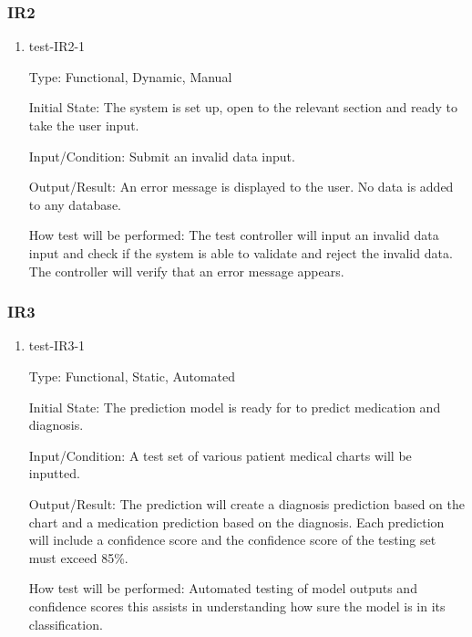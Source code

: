 \documentclass[12pt, titlepage]{article}
\begin{document}
\subsubsection{IR2}
  
  \begin{enumerate}

    \item{test-IR2-1} \label{test-IR2-1} %
    
    Type: Functional, Dynamic, Manual
    
    Initial State: The system is set up, open to the relevant section and ready to take the user input.
    
    Input/Condition: Submit an invalid data input.
    
    Output/Result: An error message is displayed to the user. No data is added to any database. 
    
    How test will be performed: The test controller will input an invalid data input and check if the system is able to validate and reject the invalid data. The controller will verify that an error message appears.

  \end{enumerate}

\subsubsection{IR3}
    
  \begin{enumerate}


    \item{test-IR3-1}  \label{test-IR3-1} %
    
    Type: Functional, Static, Automated
    
    Initial State: The prediction model is ready for to predict medication and diagnosis.
    
    Input/Condition: A test set of various patient medical charts will be inputted.
    
    Output/Result: The prediction will create a diagnosis prediction based on the chart and a medication prediction based on the diagnosis. Each prediction will include a confidence score and the confidence score of the testing set must exceed 85\%.
    
    How test will be performed: Automated testing of model outputs and confidence scores this assists in understanding how sure the model is in its classification.

  \end{enumerate}
\end{document}
